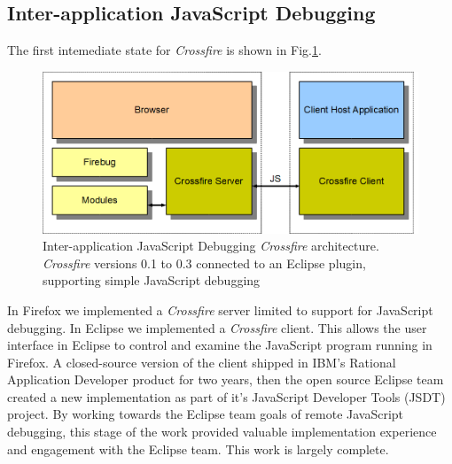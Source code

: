 \subsection{Inter-application JavaScript Debugging}
The first intemediate state for \textit{Crossfire} is shown in Fig.\ref{fig:fireclipse}.  
\begin{figure}[htp]
  \includegraphics  [width = 86 mm] {figures/fireclipse.png}
  \caption{Inter-application JavaScript Debugging \textit{Crossfire} architecture. 
\textit{Crossfire} versions 0.1 to 0.3 connected to an Eclipse plugin, supporting simple JavaScript debugging}
 \label{fig:fireclipse}
\end{figure}
In Firefox we implemented a \textit{Crossfire} server limited to support for JavaScript debugging. 
In Eclipse we implemented a \textit{Crossfire} client. This allows the user interface in Eclipse to control
 and examine the JavaScript program running
in Firefox.  A closed-source version of the client shipped in IBM's Rational Application Developer product for two years, 
then the open source Eclipse team created a new implementation as part of it's JavaScript Developer 
Tools (JSDT) project\cite{JSDT}.  By working towards the Eclipse team goals of remote JavaScript debugging, 
this stage of the work provided valuable implementation experience and engagement with the Eclipse team.
This work is largely complete.

